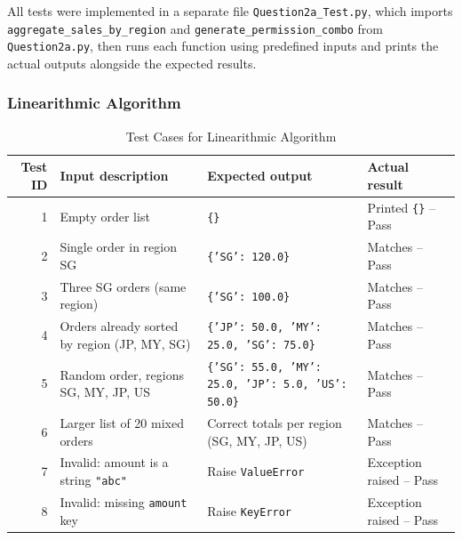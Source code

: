 \documentclass[12pt]{article}
\begin{document}
All tests were implemented in a separate file \texttt{Question2a\_Test.py}, which imports
\texttt{aggregate\_sales\_by\_region} and \texttt{generate\_permission\_combo} from \texttt{Question2a.py}, then runs each
function using predefined inputs and prints the actual outputs alongside the expected results.

\subsubsection{Linearithmic Algorithm}

\begin{table}[h]
	\centering
	\begin{tabularx}{\linewidth}{@{}rX>{\raggedright\arraybackslash}X>{\raggedright\arraybackslash}X@{}}
		\toprule
		\textbf{Test ID} & \textbf{Input description}                   & \textbf{Expected output}                                   & \textbf{Actual result}        \\
		\midrule
		1                & Empty order list                             & \texttt{\{\}}                                              & Printed \texttt{\{\}} -- Pass \\
		2                & Single order in region SG                    & \texttt{\{'SG': 120.0\}}                                   & Matches -- Pass               \\
		3                & Three SG orders (same region)                & \texttt{\{'SG': 100.0\}}                                   & Matches -- Pass               \\
		4                & Orders already sorted by region (JP, MY, SG) & \texttt{\{'JP': 50.0, 'MY': 25.0, 'SG': 75.0\}}            & Matches -- Pass               \\
		5                & Random order, regions SG, MY, JP, US         & \texttt{\{'SG': 55.0, 'MY': 25.0, 'JP': 5.0, 'US': 50.0\}} & Matches -- Pass               \\
		6                & Larger list of 20 mixed orders               & Correct totals per region (SG, MY, JP, US)                 & Matches -- Pass               \\
		7                & Invalid: amount is a string \texttt{"abc"}   & Raise \texttt{ValueError}                                  & Exception raised -- Pass      \\
		8                & Invalid: missing \texttt{amount} key         & Raise \texttt{KeyError}                                    & Exception raised -- Pass      \\
		\bottomrule
	\end{tabularx}
	\caption{Test Cases for Linearithmic Algorithm}
	\label{tab:tests-linearithmic}
\end{table}
\end{document}
